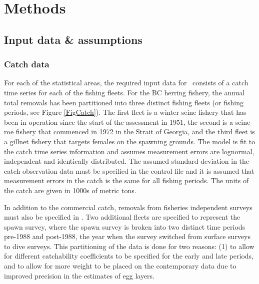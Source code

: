 \section{Methods}
	\subsection{Input data \& assumptions}
	\subsubsection{Catch data}
	For each of the statistical areas, the required input data for \iscam\ consists of a catch time series for each of the fishing fleets.  For the BC herring fishery, the annual total removals has been partitioned into three distinct fishing fleets (or fishing periods, see Figure \ref{FigCatch}).  The first fleet is a winter seine fishery that has been in operation since the start of the assessment in 1951, the second is a seine-roe fishery that commenced in 1972 in the Strait of Georgia, and the third fleet is a gillnet fishery that targets females on the spawning grounds. The model is fit to the catch time series information and assumes measurement errors are lognormal, independent and identically distributed.  The assumed standard deviation in the catch observation data must be specified in the control file and it is assumed that measurement errors in the catch is the same for all fishing periods.  The units of the catch are given in 1000s of metric tons.
	
	In addition to the commercial catch, removals from fisheries independent surveys must also be specified in \iscam. Two additional fleets are specified to represent the spawn survey, where the spawn survey is broken into two distinct time periods pre-1988 and post-1988, the year when the survey switched from surface surveys to dive surveys.  This partitioning of the data is done for two reasons: (1) to allow for different catchability coefficients to be specified for the early and late periods, and to allow for more weight to be placed on the contemporary data due to improved precision in the estimates of egg layers. 

	
